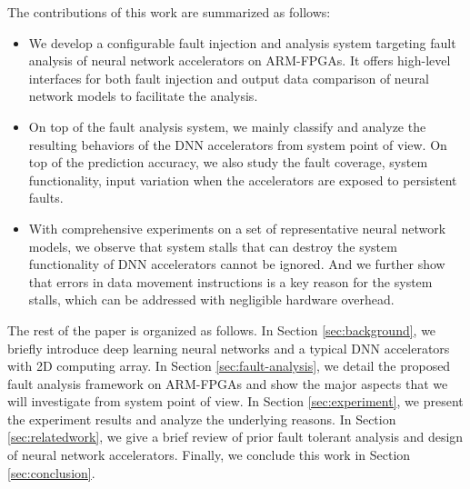 The contributions of this work are summarized as follows: 
\begin{itemize}
	\item We develop a configurable fault injection and analysis system 
	targeting fault analysis of neural network accelerators on ARM-FPGAs. 
	It offers high-level interfaces for both fault injection and 
	output data comparison of neural network models to facilitate 
	the analysis.
	
	\item On top of the fault analysis system, we mainly classify 
	and analyze the resulting behaviors of the DNN accelerators 
	from system point of view. On top of the prediction accuracy, we 
	also study the fault coverage, system functionality, input 
	variation when the accelerators are exposed to persistent faults.
	
	\item With comprehensive experiments on a set of representative 
	neural network models, we observe that system stalls that can 
	destroy the system functionality of DNN accelerators cannot be 
	ignored. And we further show that errors in data movement instructions 
	is a key reason for the system stalls, which can be addressed with 
	negligible hardware overhead.
\end{itemize}

The rest of the paper is organized as follows. In Section \ref{sec:background}, 
we briefly introduce deep learning neural networks and a typical DNN 
accelerators with 2D computing array. In Section \ref{sec:fault-analysis}, 
we detail the proposed fault analysis framework on ARM-FPGAs and show the 
major aspects that we will investigate from system point of view. 
In Section \ref{sec:experiment}, we present the experiment results and 
analyze the underlying reasons. In Section \ref{sec:relatedwork}, we give a brief 
review of prior fault tolerant analysis and design of neural network accelerators.
Finally, we conclude this work in Section \ref{sec:conclusion}.

